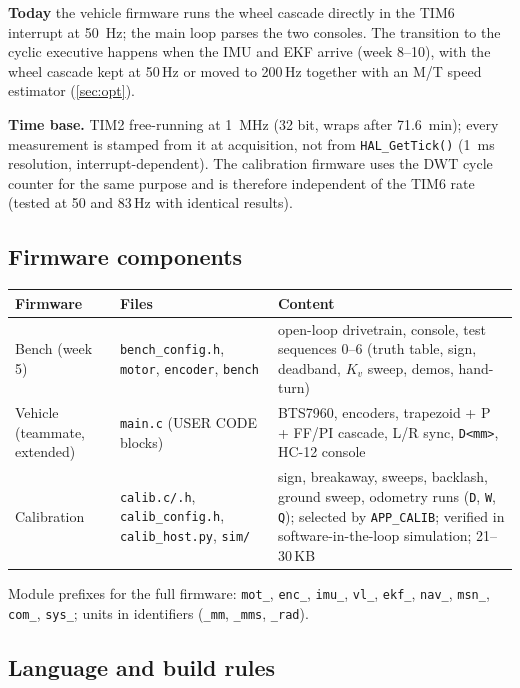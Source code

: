 \documentclass[11pt,a4paper]{article}
\newcommand{\code}[1]{\texttt{\small #1}}
\begin{document}
\textbf{Today} the vehicle firmware runs the wheel cascade directly in the TIM6
interrupt at \qty{50}{Hz}; the main loop parses the two consoles. The transition
to the cyclic executive happens when the IMU and EKF arrive (week 8--10), with
the wheel cascade kept at 50\,Hz or moved to 200\,Hz together with an M/T speed
estimator (\cref{sec:opt}).

\textbf{Time base.} TIM2 free-running at \qty{1}{MHz} (32 bit, wraps after
\qty{71.6}{min}); every measurement is stamped from it at acquisition, not from
\code{HAL\_GetTick()} (\qty{1}{ms} resolution, interrupt-dependent). The
calibration firmware uses the DWT cycle counter for the same purpose and is
therefore independent of the TIM6 rate (tested at 50 and 83\,Hz with identical
results).

\subsection{Firmware components}

\begin{center}
\small
\begin{tabularx}{\textwidth}{@{}P{30mm}P{42mm}L@{}}
\toprule
\textbf{Firmware} & \textbf{Files} & \textbf{Content}\\
\midrule
Bench (week 5) & \code{bench\_config.h}, \code{motor}, \code{encoder}, \code{bench} & open-loop drivetrain, console, test sequences 0--6 (truth table, sign, deadband, $K_v$ sweep, demos, hand-turn)\\
Vehicle (teammate, extended) & \code{main.c} (USER CODE blocks) & BTS7960, encoders, trapezoid + P + FF/PI cascade, L/R sync, \code{D<mm>}, HC-12 console\\
Calibration & \code{calib.c/.h}, \code{calib\_config.h}, \code{calib\_host.py}, \code{sim/} & sign, breakaway, sweeps, backlash, ground sweep, odometry runs (\code{D}, \code{W}, \code{Q}); selected by \code{APP\_CALIB}; verified in software-in-the-loop simulation; 21--30\,KB\\
\bottomrule
\end{tabularx}
\end{center}

Module prefixes for the full firmware: \code{mot\_}, \code{enc\_}, \code{imu\_},
\code{vl\_}, \code{ekf\_}, \code{nav\_}, \code{msn\_}, \code{com\_}, \code{sys\_}; units in
identifiers (\code{\_mm}, \code{\_mms}, \code{\_rad}).

\subsection{Language and build rules}
\end{document}
